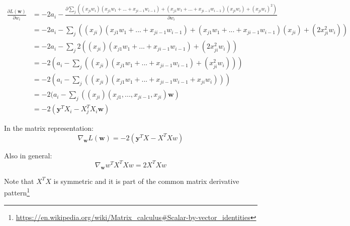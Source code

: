 \documentclass[11pt]{article}
\begin{document}
\begin{align}
\frac{\partial L(\bm{w})}{\partial w_i} 
&= -2 a_i - \frac{\partial \sum_j ( (x_{ji} w_i) (x_{j1} w_1 + ... + x_{j{i-1}} w_{i-1} ) + (x_{j1} w_1 + ... + x_{j{i-1}} w_{i-1} )(x_{ji} w_i) + (x_{ji} w_i)^2 )}{\partial w_i} \\
&= -2 a_i - \sum_j ((x_{ji}) (x_{j1} w_1 + ... + x_{j{i-1}} w_{i-1} ) + (x_{j1} w_1 + ... + x_{j{i-1}} w_{i-1} )  (x_{ji}) + (2 x_{ji}^2 w_i)) \\
&= -2 a_i - \sum_j 2 ((x_{ji}) (x_{j1} w_1 + ... + x_{j{i-1}} w_{i-1} ) + (2 x_{ji}^2 w_i)) \\
&= -2 ( a_i  - \sum_j ((x_{ji}) (x_{j1} w_1 + ... + x_{j{i-1}} w_{i-1} ) + ( x_{ji}^2 w_i))) \\
&= -2 ( a_i  - \sum_j ((x_{ji}) (x_{j1} w_1 + ... + x_{j{i-1}} w_{i-1} + x_{ji}w_i))) \\
&= -2 ( a_i  - \sum_j ((x_{ji}) (x_{j1}, ... ,x_{j{i-1}}, x_{ji}) \bm{w}) \\
&= -2 (\bm{y}^T X_i - X_j^T X_i \bm{w})
\end{align}

In the matrix representation:
$$
\nabla_{\bm{w}} L(\bm{w}) = -2(\bm{y}^TX - X^TXw)
$$

Also in general:
$$
\nabla_{\bm{w}} w^T X^T X w  = 2X^TXw
$$

Note that $X^T X$ is symmetric and it is part of the common matrix derivative pattern\footnote{\url{https://en.wikipedia.org/wiki/Matrix_calculus#Scalar-by-vector_identities}}







\end{document}
